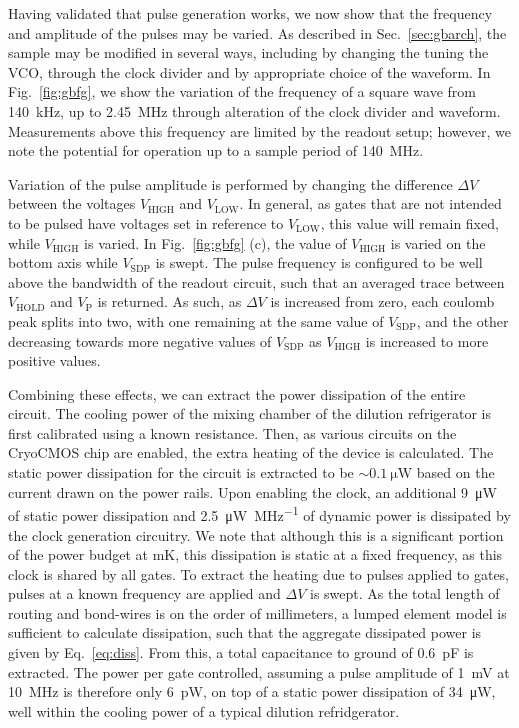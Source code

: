 Having validated that pulse generation works, we now show that the frequency and amplitude of the pulses may be varied. As described in Sec.~\ref{sec:gbarch}, the sample may be modified in several ways, including by changing the tuning the VCO, through the clock divider and by appropriate choice of the waveform. In Fig.~\ref{fig:gbfg}, we show the variation of the frequency of a square wave from \SI{140}{\kilo\hertz}, up to \SI{2.45}{\mega\hertz} through alteration of the clock divider and waveform. Measurements above this frequency are limited by the readout setup; however, we note the potential for operation up to a sample period of \SI{140}{\mega\hertz}.

Variation of the pulse amplitude is performed by changing the difference $\Delta V$ between the voltages $V_\textrm{HIGH}$ and $V_\textrm{LOW}$. In general, as gates that are not intended to be pulsed have voltages set in reference to $V_\textrm{LOW}$, this value will remain fixed, while $V_\textrm{HIGH}$ is varied. In Fig.~\ref{fig:gbfg} (c), the value of $V_\textrm{HIGH}$ is varied on the bottom axis while $V_\textrm{SDP}$ is swept. The pulse frequency is configured to be well above the bandwidth of the readout circuit, such that an averaged trace between $V_\textrm{HOLD}$ and $V_\textrm{P}$ is returned. As such, as $\Delta V$ is increased from zero, each coulomb peak splits into two, with one remaining at the same value of $V_\textrm{SDP}$, and the other decreasing towards more negative values of $V_\textrm{SDP}$ as $V_\textrm{HIGH}$ is increased to more positive values.

Combining these effects, we can extract the power dissipation of the entire circuit. The cooling power of the mixing chamber of the dilution refrigerator is first calibrated using a known resistance. Then, as various circuits on the CryoCMOS chip are enabled, the extra heating of the device is calculated. The static power dissipation for the circuit is extracted to be $\sim \SI{0.1}{\micro\watt}$ based on the current drawn on the power rails. Upon enabling the clock, an additional \SI{9}{\micro\watt} of static power dissipation and \SI[per-mode=symbol]{2.5}{\micro\watt\per\mega\hertz} of dynamic power is dissipated by the clock generation circuitry. We note that although this is a significant portion of the power budget at mK, this dissipation is static at a fixed frequency, as this clock is shared by all gates. To extract the heating due to pulses applied to gates, pulses at a known frequency are applied and $\Delta V$ is swept. As the total length of routing and bond-wires is on the order of millimeters, a lumped element model is sufficient to calculate dissipation, such that the aggregate dissipated power is given by Eq.~\ref{eq:diss}. From this, a total capacitance to ground of \SI{0.6}{\pico\farad} is extracted. The power per gate controlled, assuming a pulse amplitude of \SI{1}{\milli\volt} at \SI{10}{\mega\hertz} is therefore only \SI{6}{\pico\watt}, on top of a static power dissipation of \SI{34}{\micro\watt}, well within the cooling power of a typical dilution refridgerator.

